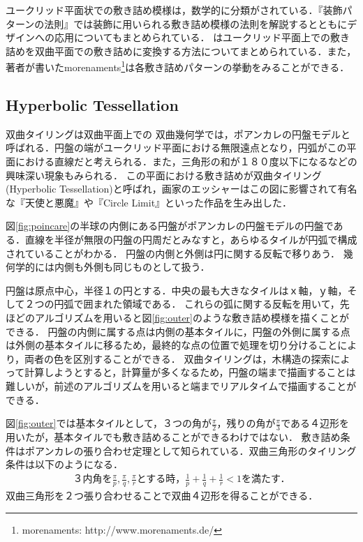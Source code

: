 ユークリッド平面状での敷き詰め模様は，数学的に分類がされている．『装飾パターンの法則』\cite{tessellationDesign}では装飾に用いられる敷き詰め模様の法則を解説するとともにデザインへの応用についてもまとめられている．
\cite{hyperbolization}はユークリッド平面上での敷き詰めを双曲平面での敷き詰めに変換する方法についてまとめられている．また，著者が書いたmorenaments\footnote{morenaments: http://www.morenaments.de/}は各敷き詰めパターンの挙動をみることができる．

\subsection{Hyperbolic Tessellation}
双曲タイリングは双曲平面上での
双曲幾何学では，ポアンカレの円盤モデルと呼ばれる．円盤の端がユークリッド平面における無限遠点となり，円弧がこの平面における直線だと考えられる．また，三角形の和が１８０度以下になるなどの興味深い現象もみられる．
この平面における敷き詰めが双曲タイリング(Hyperbolic Tessellation)と呼ばれ，画家のエッシャーはこの図に影響されて有名な『天使と悪魔』や『Circle Limit』といった作品を生み出した．

図\ref{fig:poincare}の半球の内側にある円盤がポアンカレの円盤モデルの円盤である．直線を半径が無限の円盤の円周だとみなすと，あらゆるタイルが円弧で構成されていることがわかる．
円盤の内側と外側は円に関する反転で移りあう．
幾何学的には内側も外側も同じものとして扱う．

円盤は原点中心，半径１の円とする．中央の最も大きなタイルはｘ軸，ｙ軸，そして２つの円弧で囲まれた領域である．
これらの弧に関する反転を用いて，先ほどのアルゴリズムを用いると図\ref{fig:outer}のような敷き詰め模様を描くことができる．
円盤の内側に属する点は内側の基本タイルに，円盤の外側に属する点は外側の基本タイルに移るため，最終的な点の位置で処理を切り分けることにより，両者の色を区別することができる．
双曲タイリングは，木構造の探索によって計算しようとすると，計算量が多くなるため，円盤の端まで描画することは難しいが，前述のアルゴリズムを用いると端までリアルタイムで描画することができる．

図\ref{fig:outer}では基本タイルとして，３つの角が$\frac{\pi}{2}$，残りの角が$\frac{\pi}{3}$である４辺形を用いたが，基本タイルでも敷き詰めることができるわけではない．
敷き詰め条件はポアンカレの張り合わせ定理として知られている．双曲三角形のタイリング条件は以下のようになる．
\begin{eqnarray*}
\text{３内角を}\frac{\pi}{p},\frac{\pi}{q},\frac{\pi}{r}\text{とする時，}
 \frac{1}{p} + \frac{1}{q} + \frac{1}{r} < 1 \text{を満たす．}
\end{eqnarray*}
双曲三角形を２つ張り合わせることで双曲４辺形を得ることができる．

